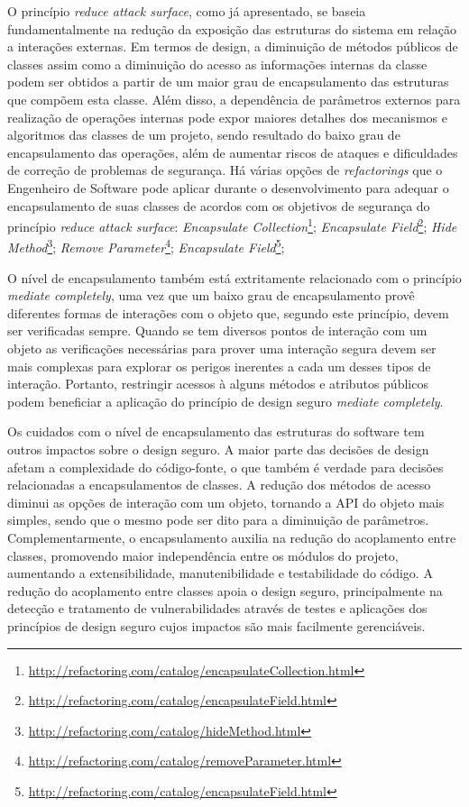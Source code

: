 %

O princípio \emph{reduce attack surface}, como já apresentado, se baseia fundamentalmente na redução da exposição das estruturas do sistema em relação a interações externas. Em termos de design, a diminuição de métodos públicos de classes assim como a diminuição do acesso as informações internas da classe podem ser obtidos a partir de um maior grau de encapsulamento das estruturas que compõem esta classe. Além disso, a dependência de parâmetros externos para realização de operações internas pode expor maiores detalhes dos mecanismos e algoritmos das classes de um projeto, sendo resultado do baixo grau de encapsulamento das operações, além de aumentar riscos de ataques e dificuldades de correção de problemas de segurança. Há várias opções de \emph{refactorings} que o Engenheiro de Software pode aplicar durante o desenvolvimento para adequar o encapsulamento de suas classes de acordos com os objetivos de segurança do princípio \emph{reduce attack surface}: \emph{Encapsulate Collection}\footnote{\url{http://refactoring.com/catalog/encapsulateCollection.html}}; \emph{Encapsulate Field}\footnote{\url{http://refactoring.com/catalog/encapsulateField.html}}; \emph{Hide Method}\footnote{\url{http://refactoring.com/catalog/hideMethod.html}}; \emph{Remove Parameter}\footnote{\url{http://refactoring.com/catalog/removeParameter.html}}; \emph{Encapsulate Field}\footnote{\url{http://refactoring.com/catalog/encapsulateField.html}};

%

O nível de encapsulamento também está extritamente relacionado com o princípio \emph{mediate completely}, uma vez que um baixo grau de encapsulamento provê diferentes formas de interações com o objeto que, segundo este princípio, devem ser verificadas sempre. Quando se tem diversos pontos de interação com um objeto as verificações necessárias para prover uma interação segura devem ser mais complexas para explorar os perigos inerentes a cada um desses tipos de interação. Portanto, restringir acessos à alguns métodos e atributos públicos podem beneficiar a aplicação do princípio de design seguro \emph{mediate completely}.

%

Os cuidados com o nível de encapsulamento das estruturas do software tem outros impactos sobre o design seguro. A maior parte das decisões de design afetam a complexidade do código-fonte, o que também é verdade para decisões relacionadas a encapsulamentos de classes. A redução dos métodos de acesso diminui as opções de interação com um objeto, tornando a API do objeto mais simples, sendo que o mesmo pode ser dito para a diminuição de parâmetros. Complementarmente, o encapsulamento auxilia na redução do acoplamento entre classes, promovendo maior independência entre os módulos do projeto, aumentando a extensibilidade, manutenibilidade e testabilidade do código. A redução do acoplamento entre classes apoia o design seguro, principalmente na detecção e tratamento de vulnerabilidades através de testes e aplicações dos princípios de design seguro cujos impactos são mais facilmente gerenciáveis.

